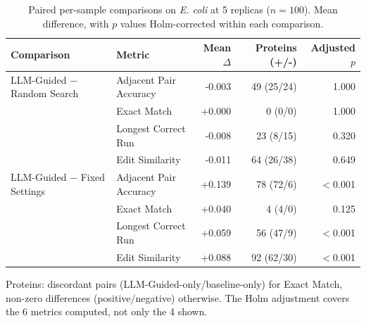 \begin{table}[!tb]
  \centering
  \caption{Paired per-sample comparisons on \textnormal{\textnormal{\textit{E. coli}}} at 5 replicas ($n=100$). Mean difference, with $p$ values Holm-corrected within each comparison.}
  \label{tab:paired_tests_ecoli_r5}
  \begin{tabular}{llrrr}
    \toprule
    Comparison & Metric & Mean $\Delta$ & Proteins (+/-) & Adjusted $p$ \\
    \midrule
    LLM-Guided $-$ Random Search & Adjacent Pair Accuracy & -0.003 & 49 (25/24) & 1.000 \\
     & Exact Match & +0.000 & 0 (0/0) & 1.000 \\
     & Longest Correct Run & -0.008 & 23 (8/15) & 0.320 \\
     & Edit Similarity & -0.011 & 64 (26/38) & 0.649 \\
    \midrule
    LLM-Guided $-$ Fixed Settings & Adjacent Pair Accuracy & +0.139 & 78 (72/6) & $<$0.001 \\
     & Exact Match & +0.040 & 4 (4/0) & 0.125 \\
     & Longest Correct Run & +0.059 & 56 (47/9) & $<$0.001 \\
     & Edit Similarity & +0.088 & 92 (62/30) & $<$0.001 \\
    \bottomrule
  \end{tabular}
  \par\smallskip\footnotesize{Proteins: discordant pairs (LLM-Guided-only/baseline-only) for Exact Match, non-zero differences (positive/negative) otherwise. The Holm adjustment covers the 6 metrics computed, not only the 4 shown.}
\end{table}
